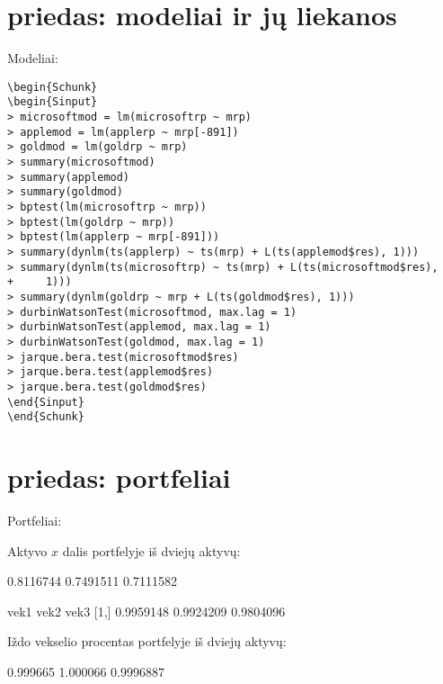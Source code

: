 \documentclass[12pt, a14paper, lithuanian]{article}
\begin{document}
\section{priedas: modeliai ir jų liekanos}
\label{B 1}
Modeliai:

\begin{verbatim}
\begin{Schunk}
\begin{Sinput}
> microsoftmod = lm(microsoftrp ~ mrp)
> applemod = lm(applerp ~ mrp[-891])
> goldmod = lm(goldrp ~ mrp)
> summary(microsoftmod)
> summary(applemod)
> summary(goldmod)
> bptest(lm(microsoftrp ~ mrp))
> bptest(lm(goldrp ~ mrp))
> bptest(lm(applerp ~ mrp[-891]))
> summary(dynlm(ts(applerp) ~ ts(mrp) + L(ts(applemod$res), 1)))
> summary(dynlm(ts(microsoftrp) ~ ts(mrp) + L(ts(microsoftmod$res), 
+     1)))
> summary(dynlm(goldrp ~ mrp + L(ts(goldmod$res), 1)))
> durbinWatsonTest(microsoftmod, max.lag = 1)
> durbinWatsonTest(applemod, max.lag = 1)
> durbinWatsonTest(goldmod, max.lag = 1)
> jarque.bera.test(microsoftmod$res)
> jarque.bera.test(applemod$res)
> jarque.bera.test(goldmod$res)
\end{Sinput}
\end{Schunk}

\end{verbatim}

\section{priedas: portfeliai}
Portfeliai:


\label{C1}
 Aktyvo $x$ dalis portfelyje iš dviejų aktyvų:

\begin{Schunk}
\begin{Soutput}
          [,1]      [,2]      [,3]
[1,] 0.8116744 0.7491511 0.7111582
\end{Soutput}
\end{Schunk}

\begin{Schunk}
\begin{Soutput}
          vek1      vek2      vek3
[1,] 0.9959148 0.9924209 0.9804096
\end{Soutput}
\end{Schunk}


 Iždo vekselio procentas portfelyje iš dviejų aktyvų:


\begin{Schunk}
\begin{Soutput}
         [,1]     [,2]      [,3]
[1,] 0.999665 1.000066 0.9996887
\end{Soutput}
\end{Schunk}
\end{document}

